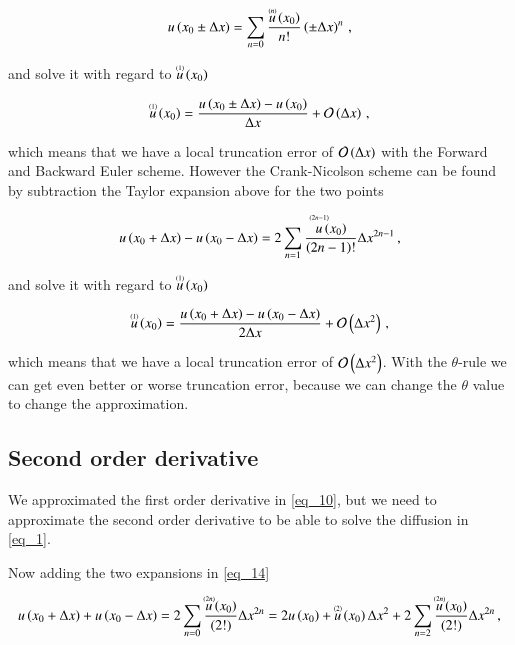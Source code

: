 \documentclass[11pt,english,a4paper]{article}
\begin{document}
\begin{flushleft}
\begin{align}
u\p{x_0\pm\Delta x} = \sum_{n=0} \frac{\T{u}{(n)}\p{x_0}}{n!}\p{\pm\Delta x}^n\,,
\label{eq_14}
\end{align}

and solve it with regard to $\T{u}{(1)}\p{x_0}$

\begin{align*}
\T{u}{(1)}\p{x_0} = \frac{u\p{x_0\pm\Delta x}-u\p{x_0}}{\Delta x} + \mathcal{O}\p{\Delta x} \,,
\end{align*}

which means that we have a local truncation error of $\mathcal{O}\p{\Delta x}$ with the Forward and Backward Euler scheme. However the Crank-Nicolson scheme can be found by subtraction the Taylor expansion above for the two points

\begin{align*}
u\p{x_0+\Delta x} - u\p{x_0-\Delta x} = 2\sum_{n=1} \frac{\T{u}{\vspace{0.1cm}(2n-1)}\p{x_0}}{\p{2n-1}!}\Delta x^{2n-1}\,,
\end{align*}

and solve it with regard to $\T{u}{(1)}\p{x_0}$

\begin{align*}
\T{u}{(1)}\p{x_0} = \frac{u\p{x_0+\Delta x} - u\p{x_0-\Delta x}}{2\Delta x} + \mathcal{O}\p{\Delta x^2}\,,
\end{align*}

which means that we have a local truncation error of $\mathcal{O}\p{\Delta x^2}$. With the $\theta$-rule we can get even better or worse truncation error, because we can change the $\theta$ value to change the approximation.

\subsection{Second order derivative}

We approximated the first order derivative in \eqref{eq_10}, but we need to approximate the second order derivative to be able to solve the diffusion in \eqref{eq_1}.

Now adding the two expansions in \eqref{eq_14}

\begin{align*}
u\p{x_0+\Delta x} + u\p{x_0-\Delta x} = 2\sum_{n=0} \frac{\T{u}{(2n)}\p{x_0}}{(2!)}\Delta x^{2n} = 2 u\p{x_0} + \T{u}{(2)}\p{x_0}\Delta x^2 + 2\sum_{n=2} \frac{\T{u}{(2n)}\p{x_0}}{(2!)}\Delta x^{2n}\,,
\end{align*}


\end{flushleft}
\end{document}
